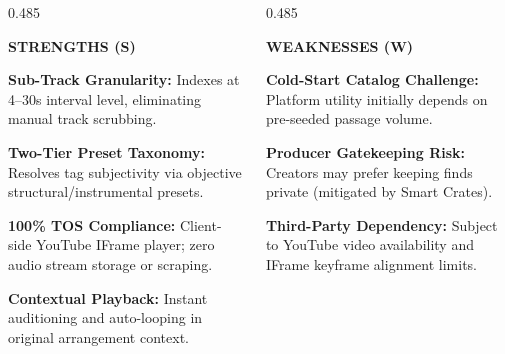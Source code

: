 \begin{frame}[t]

  \begin{columns}[onlytextwidth, T]
    \begin{column}{0.485\textwidth}
      \begin{tcolorbox}[standardcard, top=3pt, bottom=3pt]
        {\scriptsize\bfseries\textcolor{accentemerald}{STRENGTHS (S)}}\par\vspace{0.8mm}
        \begin{compactlist}
          \tiny
          \item \textbf{Sub-Track Granularity:} Indexes at 4--30s interval level, eliminating manual track scrubbing.
          \item \textbf{Two-Tier Preset Taxonomy:} Resolves tag subjectivity via objective structural/instrumental presets.
          \item \textbf{100\% TOS Compliance:} Client-side YouTube IFrame player; zero audio stream storage or scraping.
          \item \textbf{Contextual Playback:} Instant auditioning and auto-looping in original arrangement context.
        \end{compactlist}
      \end{tcolorbox}
    \end{column}

    \begin{column}{0.485\textwidth}
      \begin{tcolorbox}[standardcard, top=3pt, bottom=3pt]
        {\scriptsize\bfseries\textcolor{textdim}{WEAKNESSES (W)}}\par\vspace{0.8mm}
        \begin{compactlist}
          \tiny
          \item \textbf{Cold-Start Catalog Challenge:} Platform utility initially depends on pre-seeded passage volume.
          \item \textbf{Producer Gatekeeping Risk:} Creators may prefer keeping finds private (mitigated by Smart Crates).
          \item \textbf{Third-Party Dependency:} Subject to YouTube video availability and IFrame keyframe alignment limits.
        \end{compactlist}
      \end{tcolorbox}
    \end{column}
  \end{columns}


\end{frame}
